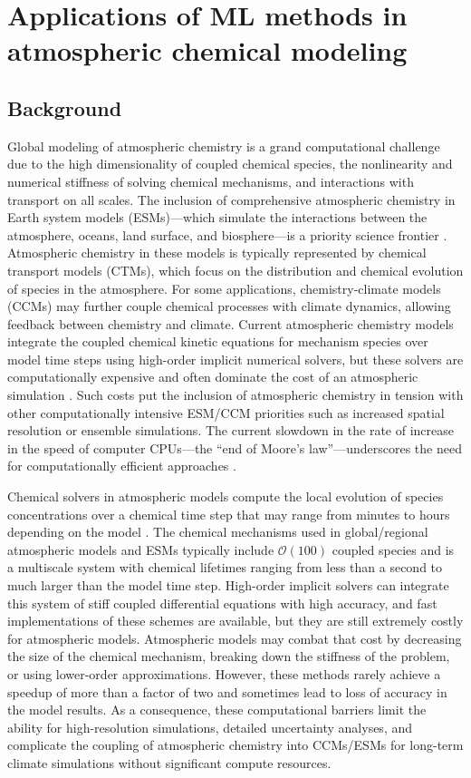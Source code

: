 \documentclass[gmd, manuscript]{copernicus}
\begin{document}
\section{Applications of ML methods in atmospheric chemical modeling}
\subsection{Background}
Global modeling of atmospheric chemistry is a grand computational challenge due to the high dimensionality of coupled chemical species, the nonlinearity and numerical stiffness of solving chemical mechanisms, and interactions with transport on all scales. The inclusion of comprehensive atmospheric chemistry in Earth system models (ESMs)—which simulate the interactions between the atmosphere, oceans, land surface, and biosphere—is a priority science frontier \citep{national_research_council_national_2012}. Atmospheric chemistry in these models is typically represented by chemical transport models (CTMs), which focus on the distribution and chemical evolution of species in the atmosphere. For some applications, chemistry-climate models (CCMs) may further couple chemical processes with climate dynamics, allowing feedback between chemistry and climate. Current atmospheric chemistry models integrate the coupled chemical kinetic equations for mechanism species over model time steps using high-order implicit numerical solvers, but these solvers are computationally expensive \citep{sandu_benchmarking_1997} and often dominate the cost of an atmospheric simulation \citep{eastham_geos-chem_2018}. Such costs put the inclusion of atmospheric chemistry in tension with other computationally intensive ESM/CCM priorities such as increased spatial resolution or ensemble simulations. The current slowdown in the rate of increase in the speed of computer CPUs—the “end of Moore's law”—underscores the need for computationally efficient approaches \citep{theis_end_2017}.
 
Chemical solvers in atmospheric models compute the local evolution of species concentrations over a chemical time step that may range from minutes to hours depending on the model \citet{brasseur_modeling_2017}. The chemical mechanisms used in global/regional atmospheric models and ESMs typically include $\mathcal{O}(100)$ coupled species and is a multiscale system with chemical lifetimes ranging from less than a second to much larger than the model time step. High-order implicit solvers can integrate this system of stiff coupled differential equations with high accuracy, and fast implementations of these schemes are available, but they are still extremely costly for atmospheric models. Atmospheric models may combat that cost by decreasing the size of the chemical mechanism, breaking down the stiffness of the problem, or using lower-order approximations. However, these methods rarely achieve a speedup of more than a factor of two \citep{lin_adaptive_2023, shen_adaptive_2020} and sometimes lead to loss of accuracy in the model results. As a consequence, these computational barriers limit the ability for high-resolution simulations, detailed uncertainty analyses, and complicate the coupling of atmospheric chemistry into CCMs/ESMs for long-term climate simulations without significant compute resources. 
 
\end{document}
